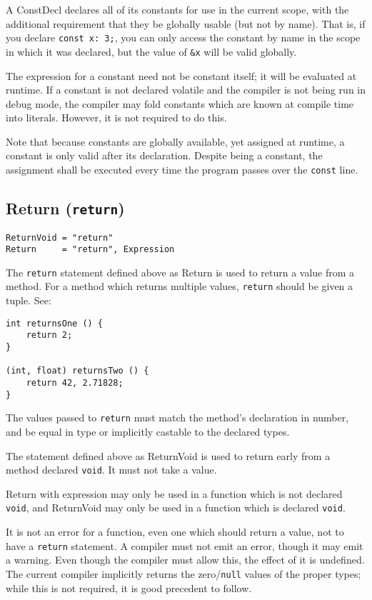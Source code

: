 \documentclass{article}
\begin{document}
A ConstDecl declares all of its constants for use in the current scope, with the
additional requirement that they be globally usable (but not by name). That is,
if you declare \texttt{const~x:~3;}, you can only access the constant by name in
the scope in which it was declared, but the value of \texttt{\&x} will be valid
globally.

The expression for a constant need not be constant itself; it will be evaluated
at runtime. If a constant is not declared volatile and the compiler is not being
run in debug mode, the compiler may fold constants which are known at compile time
into literals. However, it is not required to do this.

Note that because constants are globally available, yet assigned at runtime, a
constant is only valid after its declaration. Despite being a constant, the
assignment shall be executed every time the program passes over the \texttt{const}
line.

\subsection{Return (\texttt{return})}
\label{sub:statements:return}
\begin{verbatim}
ReturnVoid = "return"
Return     = "return", Expression
\end{verbatim}

The \texttt{return} statement defined above as Return is used to return a
value from a method. For a method which returns multiple values,
\texttt{return} should be given a tuple. See:
\begin{verbatim}
int returnsOne () {
    return 2;
}

(int, float) returnsTwo () {
    return 42, 2.71828;
}
\end{verbatim}

The values passed to \texttt{return} must match the method's declaration in
number, and be equal in type or implicitly castable to the declared types.

The statement defined above as ReturnVoid is used to return early from a
method declared \texttt{void}. It must not take a value.

Return with expression may only be used in a function which is not declared
\texttt{void}, and ReturnVoid may only be used in a function which is declared
\texttt{void}.

It is not an error for a function, even one which should return a value, not
to have a \texttt{return} statement. A compiler must not emit an error, though
it may emit a warning. Even though the compiler must allow this, the effect of
it is undefined. The current compiler implicitly returns the
zero/\texttt{null} values of the proper types; while this is not required, it
is good precedent to follow.
\end{document}
